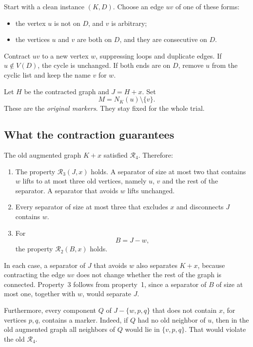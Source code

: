 \documentclass[11pt]{article}
\newcommand{\cR}{\mathcal R}
\begin{document}
Start with a clean instance $(K,D)$. Choose an edge $uv$ of one of these forms:
\begin{itemize}[nosep]
\item the vertex $u$ is not on $D$, and $v$ is arbitrary;
\item the vertices $u$ and $v$ are both on $D$, and they are consecutive on $D$.
\end{itemize}
Contract $uv$ to a new vertex $w$, suppressing loops and duplicate edges. If
$u\notin V(D)$, the cycle is unchanged. If both ends are on $D$, remove $u$
from the cyclic list and keep the name $v$ for $w$.

Let $H$ be the contracted graph and $J=H+x$. Set
\begin{equation*}
M=N_K(u)\setminus\{v\}.
\end{equation*}
These are the \emph{original markers}. They stay fixed for the whole trial.

\subsection{What the contraction guarantees}\label{sec:guarantees}

The old augmented graph $K+x$ satisfied $\cR_4$. Therefore:
\begin{enumerate}[nosep]
\item The property $\cR_3(J,x)$ holds. A separator of size at most two that contains $w$
lifts to at most three old vertices, namely $u$, $v$ and the rest of the
separator. A separator that avoids $w$ lifts unchanged.
\item Every separator of size at most three that excludes $x$ and disconnects
$J$ contains $w$.
\item For
\begin{equation*}
B=J-w,
\end{equation*}
the property $\cR_2(B,x)$ holds.
\end{enumerate}
In each case, a separator of $J$ that avoids $w$ also separates $K+x$, because
contracting the edge $uv$ does not change whether the rest of the graph is
connected. Property~3 follows from property~1, since a separator of $B$ of size
at most one, together with $w$, would separate $J$.

Furthermore, every component $Q$ of $J-\{w,p,q\}$ that does not contain $x$,
for vertices $p,q$, contains a marker. Indeed, if $Q$ had no old neighbor of
$u$, then in the old augmented graph all neighbors of $Q$ would lie in
$\{v,p,q\}$. That would violate the old $\cR_4$.
\end{document}
